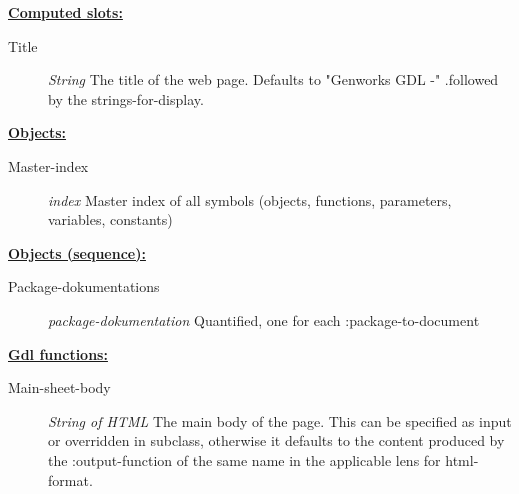 \documentclass [11pt]{book}
\begin{document}
\begin{itemize}
\begin{description}
\end{description}






\textbf{
\underline{Computed slots:}}

\begin{description}

\item [Title]
\emph{String} The title of the web page. Defaults to "Genworks GDL -"
.followed by the strings-for-display.


\end{description}






\textbf{
\underline{Objects:}}

\begin{description}

\item [Master-index]
\emph{index} Master index of all symbols (objects, functions, parameters, variables, constants)


\end{description}






\textbf{
\underline{Objects (sequence):}}

\begin{description}

\item [Package-dokumentations]
\emph{package-dokumentation} Quantified, one for each :package-to-document


\end{description}






\textbf{
\underline{Gdl functions:}}

\begin{description}

\item [Main-sheet-body]
\emph{String of HTML} The main body of the page.
This can be specified as input or overridden in subclass, otherwise it defaults
to the content produced by the :output-function of the same name
in the applicable lens for  html-format.


\end{description}








\end{itemize}
\end{document}
